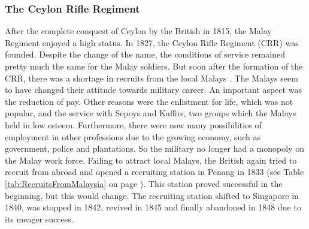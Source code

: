 % 






\subsubsection{The Ceylon Rifle Regiment}\label{sec:slmbg:TheCeylonRifleRegiment}
After the complete conquest of Ceylon by the British in
1815, the Malay Regiment enjoyed a high status. In 1827, the
Ceylon Rifle Regiment (CRR) was founded. Despite the change of the
name, the conditions of service remained pretty much the same for
the Malay soldiers. But soon after the formation of the CRR, there
was a shortage in recruits from the local Malays
\citep[83f]{Hussainmiya1990}. The Malays seem to have changed
their attitude towards military career. An important aspect was
the reduction of pay. Other reasons were the enlistment for life,
which was not popular, and the service with Sepoys and Kaffirs,
two groups which the Malays held in low esteem. Furthermore, there
were now many possibilities of employment in other professions
due to the growing economy, such as government, police and
plantations. So the military  no longer had a monopoly on the Malay
work force. Failing to attract local Malays, the British again
tried to recruit from abroad and opened a recruiting station in
Penang in 1833  (see Table \ref{tab:RecruitsFromMalaysia} on page \pageref{tab:RecruitsFromMalaysia}). This station proved successful in the beginning, but this would change. The recruiting station shifted to
Singapore in 1840, was stopped in 1842, revived in 1845 and
finally abandoned in 1848 due to its meager success.

